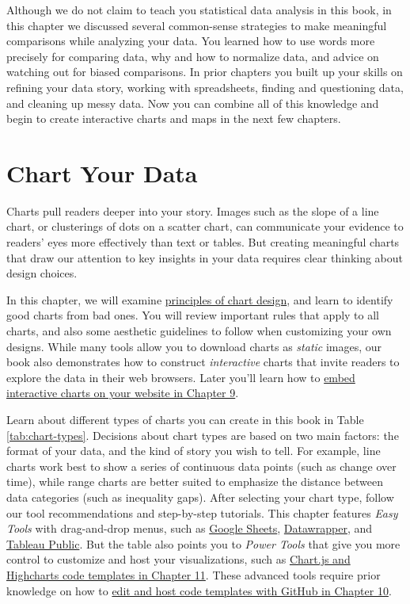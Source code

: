 \documentclass[
  english,
]{book}
\begin{document}
Although we do not claim to teach you statistical data analysis in this book, in this chapter we discussed several common-sense strategies to make meaningful comparisons while analyzing your data. You learned how to use words more precisely for comparing data, why and how to normalize data, and advice on watching out for biased comparisons. In prior chapters you built up your skills on refining your data story, working with spreadsheets, finding and questioning data, and cleaning up messy data. Now you can combine all of this knowledge and begin to create interactive charts and maps in the next few chapters.

\hypertarget{chart}{%
\chapter{Chart Your Data}\label{chart}}

Charts pull readers deeper into your story. Images such as the slope of a line chart, or clusterings of dots on a scatter chart, can communicate your evidence to readers' eyes more effectively than text or tables. But creating meaningful charts that draw our attention to key insights in your data requires clear thinking about design choices.

In this chapter, we will examine \href{chart-design.html}{principles of chart design}, and learn to identify good charts from bad ones. You will review important rules that apply to all charts, and also some aesthetic guidelines to follow when customizing your own designs. While many tools allow you to download charts as \emph{static} images, our book also demonstrates how to construct \emph{interactive} charts that invite readers to explore the data in their web browsers. Later you'll learn how to \href{embed.html}{embed interactive charts on your website in Chapter 9}.

Learn about different types of charts you can create in this book in Table \ref{tab:chart-types}. Decisions about chart types are based on two main factors: the format of your data, and the kind of story you wish to tell. For example, line charts work best to show a series of continuous data points (such as change over time), while range charts are better suited to emphasize the distance between data categories (such as inequality gaps). After selecting your chart type, follow our tool recommendations and step-by-step tutorials. This chapter features \emph{Easy Tools} with drag-and-drop menus, such as \href{chart-google.html}{Google Sheets}, \href{chart-datawrapper.html}{Datawrapper}, and \href{chart-tableau.html}{Tableau Public}. But the table also points you to \emph{Power Tools} that give you more control to customize and host your visualizations, such as \href{chartcode.html}{Chart.js and Highcharts code templates in Chapter 11}. These advanced tools require prior knowledge on how to \href{github.html}{edit and host code templates with GitHub in Chapter 10}.
\end{document}
